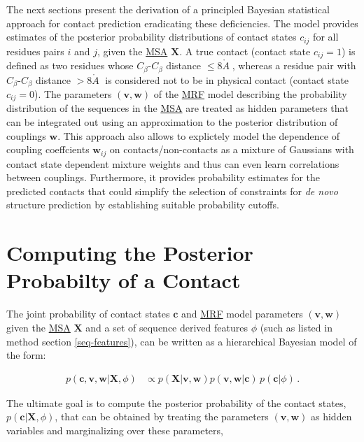 \documentclass[11pt,a4paper,twoside]{book}
\newcommand{\Cb}{C_\beta}
\newcommand{\eq}{\!=\!}
\renewcommand{\c}{\mathbf{c}}
\newcommand{\cij}{c_{ij}}
\renewcommand{\v}{\mathbf{v}}
\newcommand{\w}{\mathbf{w}}
\newcommand{\wij}{\mathbf{w}_{ij}}
\newcommand{\X}{\mathbf{X}}
\newcommand{\angstrom}{\mathring{A} \;}
\theoremstyle{definition}
\theoremstyle{definition}
\theoremstyle{remark}
\begin{document}
The next sections present the derivation of a principled Bayesian
statistical approach for contact prediction eradicating these
deficiencies. The model provides estimates of the posterior probability
distributions of contact states \(\cij\) for all residues pairs \(i\)
and \(j\), given the \protect\hyperlink{abbrev}{MSA} \(\X\). A true
contact (contact state \(\cij\eq1\)) is defined as two residues whose
\(\Cb\)-\(\Cb\) distance \(\le 8 \angstrom\), whereas a residue pair
with \(\Cb\)-\(\Cb\) distance \(>8 \angstrom\) is considered not to be
in physical contact (contact state \(\cij\eq0\)). The parameters
\((\v, \w)\) of the \protect\hyperlink{abbrev}{MRF} model describing the
probability distribution of the sequences in the
\protect\hyperlink{abbrev}{MSA} are treated as hidden parameters that
can be integrated out using an approximation to the posterior
distribution of couplings \(\w\). This approach also allows to
explictely model the dependence of coupling coeffcients \(\wij\) on
contacts/non-contacts as a mixture of Gaussians with contact state
dependent mixture weights and thus can even learn correlations between
couplings. Furthermore, it provides probability estimates for the
predicted contacts that could simplify the selection of constraints for
\emph{de novo} structure prediction by establishing suitable probability
cutoffs.

\section{Computing the Posterior Probabilty of a
Contact}\label{overview-posterior-distances}

The joint probability of contact states \(\c\) and
\protect\hyperlink{abbrev}{MRF} model parameters \((\v, \w)\) given the
\protect\hyperlink{abbrev}{MSA} \(\X\) and a set of sequence derived
features \(\phi\) (such as listed in method section \ref{seq-features}),
can be written as a hierarchical Bayesian model of the form:

\begin{align}
        p(\c, \v, \w | \X, \phi) &\propto p(\X | \v, \w) p(\v, \w | \c) \, p(\c | \phi ) \, .
\label{eq:hierarchical-bayesian-model}
\end{align}

The ultimate goal is to compute the posterior probability of the contact
states, \(p(\c | \X, \phi)\), that can be obtained by treating the
parameters \((\v, \w)\) as hidden variables and marginalizing over these
parameters,
\end{document}
